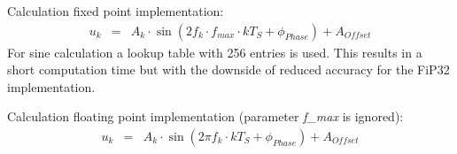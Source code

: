 Calculation fixed point implementation:
\begin{eqnarray*}
	u_k &=& A_k\cdot \sin{(2 f_k\cdot f_{max}\cdot k T_S + \phi_{Phase})} + A_{Offset}
\end{eqnarray*}
For sine calculation a lookup table with 256 entries is used. This results in a short computation time but with the downside of reduced accuracy for the FiP32 implementation.

\medskip
Calculation floating point implementation (parameter \textit{f\_max} is ignored):
\begin{eqnarray*}
	u_k &=& A_k\cdot \sin{(2 \pi f_k \cdot k T_S + \phi_{Phase})} + A_{Offset}
\end{eqnarray*}